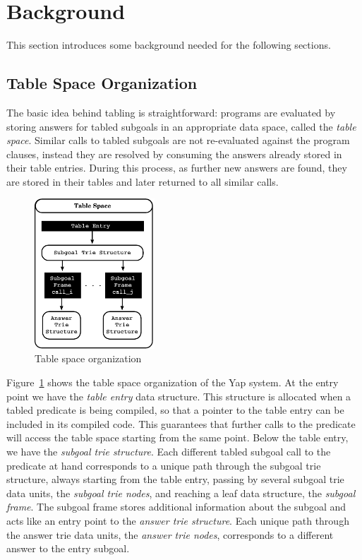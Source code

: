 \documentclass{llncs}
\begin{document}
\section{Background}

This section introduces some background needed for the following
sections. 


\subsection{Table Space Organization}

The basic idea behind tabling is straightforward: programs are
evaluated by storing answers for tabled subgoals in an appropriate
data space, called the \emph{table space}. Similar calls to tabled
subgoals are not re-evaluated against the program clauses, instead
they are resolved by consuming the answers already stored in their
table entries. During this process, as further new answers are found,
they are stored in their tables and later returned to all similar
calls.

\begin{figure}
\vspace{-\intextsep}
\centering
\includegraphics[width=4.5cm]{figures/table-space.pdf}
\caption{Table space organization}
\label{fig_table_space}
\vspace{-0.5\intextsep}
\end{figure}

Figure~\ref{fig_table_space} shows the table space organization of the
Yap system. At the entry point we have the \emph{table entry} data
structure. This structure is allocated when a tabled predicate is
being compiled, so that a pointer to the table entry can be included
in its compiled code. This guarantees that further calls to the
predicate will access the table space starting from the same
point. Below the table entry, we have the \emph{subgoal trie
  structure}. Each different tabled subgoal call to the predicate at
hand corresponds to a unique path through the subgoal trie structure,
always starting from the table entry, passing by several subgoal trie
data units, the \emph{subgoal trie nodes}, and reaching a leaf data
structure, the \emph{subgoal frame}. The subgoal frame stores
additional information about the subgoal and acts like an entry point
to the \emph{answer trie structure}. Each unique path through the
answer trie data units, the \emph{answer trie nodes}, corresponds to a
different answer to the entry subgoal.
\end{document}
